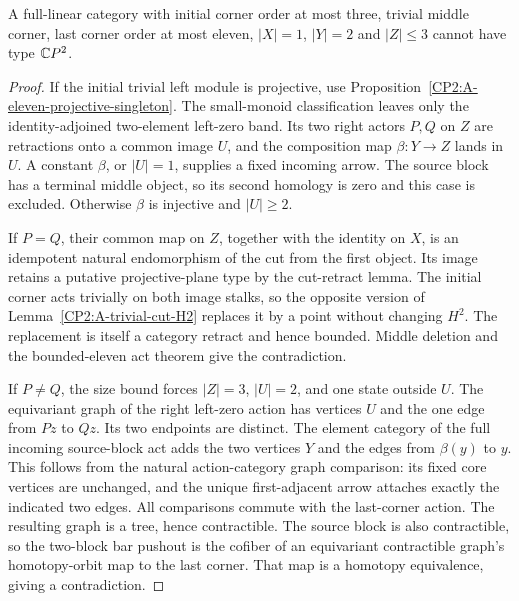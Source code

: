 \begin{proposition}
\label{CP2:A-three-initial-singleton}
A full-linear category with initial corner order at
most three, trivial middle corner, last corner order
at most eleven, $|X|=1$, $|Y|=2$ and $|Z|\leq3$
cannot have type $\mathbb{C}P^2$.
\end{proposition}
\begin{proof}
If the initial trivial left module is projective,
use Proposition~\ref{CP2:A-eleven-projective-singleton}.
The small-monoid classification leaves only the
identity-adjoined two-element left-zero band.
Its two right actors $P,Q$ on $Z$ are retractions
onto a common image $U$, and the composition map
$\beta:Y\to Z$ lands in $U$. A constant $\beta$,
or $|U|=1$, supplies a fixed incoming arrow. The
source block has a terminal middle object, so its
second homology is zero and this case is excluded.
Otherwise $\beta$ is injective and $|U|\geq2$.

If $P=Q$, their common map on $Z$, together with
the identity on $X$, is an idempotent natural
endomorphism of the cut from the first object.
Its image retains a putative projective-plane type
by the cut-retract lemma. The initial corner acts
trivially on both image stalks, so the opposite
version of Lemma~\ref{CP2:A-trivial-cut-H2} replaces
it by a point without changing $H^2$. The replacement
is itself a category retract and hence bounded.
Middle deletion and the bounded-eleven act theorem
give the contradiction.

If $P\ne Q$, the size bound forces $|Z|=3$,
$|U|=2$, and one state outside $U$. The equivariant
graph of the right left-zero action has vertices
$U$ and the one edge from $Pz$ to $Qz$. Its two
endpoints are distinct. The element category of
the full incoming source-block act adds the two
vertices $Y$ and the edges from $\beta(y)$ to $y$.
This follows from the natural action-category graph
comparison: its fixed core vertices are unchanged,
and the unique first-adjacent arrow attaches exactly
the indicated two edges. All comparisons commute
with the last-corner action. The resulting graph
is a tree, hence contractible. The source block is
also contractible, so the two-block bar pushout is
the cofiber of an equivariant contractible graph's
homotopy-orbit map to the last corner. That map is
a homotopy equivalence, giving a contradiction.
\end{proof}

